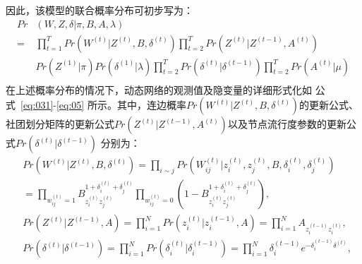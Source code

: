 因此，该模型的联合概率分布可初步写为：
\begin{equation}
\begin{split}
Pr&(W,Z,\delta|\pi,B,A,\lambda) \\
=    &   \prod_{t=1}^{T} Pr(W^{(t)}|Z^{(t)},B,\delta^{(t)}) \prod_{t=2}^{T} Pr(Z^{(t)}|Z^{(t-1)},A^{(t)})   \\
& Pr(Z^{(1)}|\pi) Pr(\delta^{(1)}|\lambda) \prod_{t=2}^{T} Pr(\delta^{(t)}|\delta^{(t-1)}) \prod_{t=2}^{T} Pr(A^{(t)} | \mu)\\
\label{eq:03}
\end{split}
\end{equation}
在上述概率分布的情况下，动态网络的观测值及隐变量的详细形式化如 公式~\ref{eq:031}-\ref{eq:05} 所示。其中，连边概率$Pr(W^{(t)}|Z^{(t)},B,\delta^{(t)})$的更新公式、社团划分矩阵的更新公式$Pr(Z^{(t)}|Z^{(t-1)},A^{(t)})$以及节点流行度参数的更新公式$Pr(\delta^{(t)}|\delta^{(t-1)})$ 分别为：
\begin{align}
   &Pr  (W^{(t)}|Z^{(t)},B,\delta^{(t)}) = \prod_{i \sim j} Pr(W^{(t)}_{ij}|z^{(t)}_i ,z^{(t)}_j, B, \delta^{(t)}_i, \delta^{(t)}_j )   \nonumber  \\
& = \prod_{w_{ij}^{(t)}=1} B_{z_i^{(t)} z_j^{(t)}}^{1+\delta_i^{(t)}+\delta_j^{(t)}}  \prod_{w_{ij}^{(t)}=0} (1-B_{z_i^{(t)} z_j^{(t)}}^{1+\delta_i^{(t)}+\delta_j^{(t)}}),     
\label{eq:031}\\
&Pr(Z^{(t)}|Z^{(t-1)},A) = \prod_{i=1}^{N} Pr(z_i^{(t)} | z_i^{(t-1)},A )= \prod_{i=1}^{N} A_{z_i^{(t-1)} z_i^{(t)}},  
\label{eq:04}\\
&Pr (\delta^{(t)}|\delta^{(t-1)})  = \prod_{i=1}^{N} Pr(\delta_i^{(t)}|\delta_i^{(t-1)}) = \prod_{i=1}^{N} \delta_i^{(t-1)} e^{-\delta_i^{(t-1)} \delta^{(t)}},
\label{eq:05}
\end{align}

